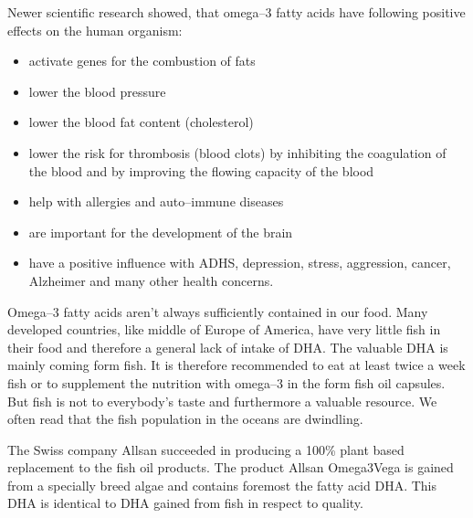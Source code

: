 \documentclass[../main.tex]{subfiles}
\begin{document}
Newer scientific research showed, that omega--3 fatty acids have following positive effects on the human organism:
\begin{itemize}
\item activate genes for the combustion of fats
\item lower the blood pressure
\item lower the blood fat content (cholesterol)
\item lower the risk for thrombosis (blood clots) by inhibiting the coagulation
  of the blood and by improving the flowing capacity of the blood
  \item help with allergies and auto--immune diseases
  \item are important for the development of the brain
  \item have a positive influence with ADHS, depression, stress, aggression,
    cancer, Alzheimer and many other health concerns.
\end{itemize}

Omega--3 fatty acids aren't always sufficiently contained in our food.
Many developed countries, like middle of Europe of America, have very little fish in their food and therefore a general lack of intake of DHA.
The valuable DHA is mainly coming form fish.
It is therefore recommended to eat at least twice a week fish or to supplement the nutrition with omega--3 in the form fish oil capsules.
But fish is not to everybody's taste and furthermore a valuable resource.
We often read that the fish population in the oceans are dwindling.

The Swiss company Allsan succeeded in producing a 100\% plant based replacement to the fish oil products.
The product Allsan Omega3Vega is gained from a specially breed algae and contains foremost the fatty acid DHA.
This DHA is identical to DHA gained from fish in respect to quality.
\end{document}
